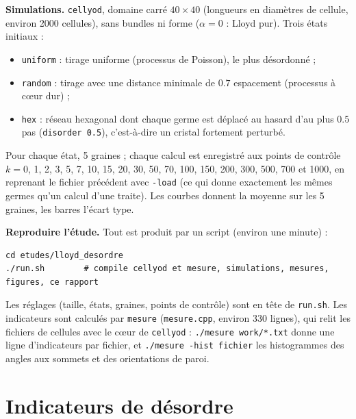 \documentclass[10pt,a4paper]{article}
\newcommand{\code}[1]{\texttt{#1}}
\begin{document}
\textbf{Simulations.} \code{cellyod}, domaine carré $40\times40$ (longueurs en diamètres de cellule, environ
2000 cellules), sans bundles ni forme ($\alpha=0$ : Lloyd pur). Trois états initiaux :
\begin{itemize}
  \item \code{uniform} : tirage uniforme (processus de Poisson), le plus désordonné ;
  \item \code{random} : tirage avec une distance minimale de $0.7$ espacement (processus à cœur dur) ;
  \item \code{hex} : réseau hexagonal dont chaque germe est déplacé au hasard d'au plus $0.5$ pas
    (\code{disorder 0.5}), c'est-à-dire un cristal fortement perturbé.
\end{itemize}
Pour chaque état, 5 graines ; chaque calcul est enregistré aux points de contrôle
$k={}$0, 1, 2, 3, 5, 7, 10, 15, 20, 30, 50, 70, 100, 150, 200, 300, 500, 700 et 1000, en reprenant le fichier
précédent avec \code{-load} (ce qui donne exactement les mêmes germes qu'un calcul d'une traite). Les courbes
donnent la moyenne sur les 5 graines, les barres l'écart type.

\textbf{Reproduire l'étude.} Tout est produit par un script (environ une minute) :
\begin{lstlisting}
cd etudes/lloyd_desordre
./run.sh        # compile cellyod et mesure, simulations, mesures, figures, ce rapport
\end{lstlisting}
Les réglages (taille, états, graines, points de contrôle) sont en tête de \code{run.sh}. Les indicateurs sont
calculés par \code{mesure} (\code{mesure.cpp}, environ 330 lignes), qui relit les fichiers de cellules avec
le cœur de \code{cellyod} : \code{./mesure work/*.txt} donne une ligne d'indicateurs par fichier, et
\code{./mesure -hist fichier} les histogrammes des angles aux sommets et des orientations de paroi.

\section{Indicateurs de désordre}
\end{document}
